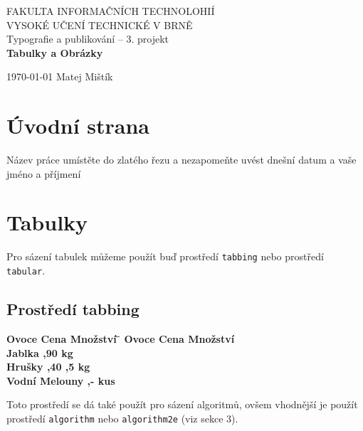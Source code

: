 \documentclass[a4 paper,11pt]{article}
\begin{document}
\begin{titlepage}
\begin{center}

\huge
{FAKULTA INFORMAČNÍCH TECHNOLOHIÍ\\[0.4em]
VYSOKÉ UČENÍ TECHNICKÉ V BRNĚ}\\
\LARGE
{Typografie a publikování -- 3. projekt \\[0.3em] 
\textbf{\huge{Tabulky a Obrázky}}}

{\LARGE \today \hfill 
{Matej Mištík }}

\end{center}
\end{titlepage}

\section{Úvodní strana}
Název práce umístěte do zlatého řezu a nezapomeňte uvést dnešní datum a vaše jméno a příjmení


\section{Tabulky}

Pro sázení tabulek můžeme použít buď prostředí \verb|tabbing| nebo prostředí \verb|tabular|.

\subsection{Prostředí \ttfamily tabbing}

\begin{tabbing}
  \bfseries Ovoce \hspace{25mm} \=\bfseries Cena \quad \=\bfseries Množství \quad \= \kill
  \bfseries Ovoce \> \bfseries Cena \> \bfseries Množství \>  \\
  Jablka        ,90  kg \\
  Hrušky        ,40 ,5 kg \\ 
  Vodní Melouny ,-   kus \\
  
  
\end{tabbing}

\begin{flushleft}

Toto prostředí se dá také použít pro sázení algoritmů, ovšem vhodnější je použít 
prostředí \verb|algorithm| nebo \verb|algorithm2e| (viz sekce 3).

\end{flushleft}
\end{document}
